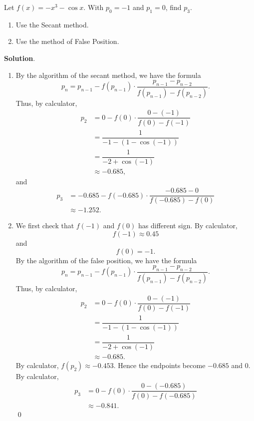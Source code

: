 \documentclass[11pt]{article}
\theoremstyle{break}
\numberwithin{equation}{theorem}
\begin{document}
\newpage
\begin{problem}\label{problem 7}
    Let $f(x)=-x^3-\cos x$. With $p_0=-1$ and $p_1=0$, find $p_3$.
    \begin{enumerate}
        \item Use the Secant method.
        \item Use the method of False Position.
    \end{enumerate}
\end{problem}
\textbf{Solution}.
\begin{enumerate}
    \item By the algorithm of the secant method, we have the formula
    \begin{equation*}
        p_n=p_{n-1}-f(p_{n-1})\cdot\dfrac{p_{n-1}-p_{n-2}}{f(p_{n-1})-f(p_{n-2})}.
    \end{equation*}
    Thus, by calculator,
    \begin{align*}
        p_2&=0-f(0)\cdot\dfrac{0-(-1)}{f(0)-f(-1)}\\
        &=\dfrac{1}{-1-(1-\cos(-1))}\\
        &=\dfrac{1}{-2+\cos(-1)}\\
        &\approx-0.685,
    \end{align*}
    and
    \begin{align*}
        p_3&=-0.685-f(-0.685)\cdot\dfrac{-0.685-0}{f(-0.685)-f(0)}\\
        &\approx-1.252.
    \end{align*}
    \item We first check that $f(-1)$ and $f(0)$ has different sign. By calculator,
    \begin{equation*}
        f(-1)\approx0.45
    \end{equation*}
    and
    \begin{equation*}
        f(0)=-1.
    \end{equation*}
    By the algorithm of the false position, we have the formula
    \begin{equation*}
        p_n=p_{n-1}-f(p_{n-1})\cdot\dfrac{p_{n-1}-p_{n-2}}{f(p_{n-1})-f(p_{n-2})}.
    \end{equation*}
    Thus, by calculator,
    \begin{align*}
        p_2&=0-f(0)\cdot\dfrac{0-(-1)}{f(0)-f(-1)}\\
        &=\dfrac{1}{-1-(1-\cos(-1))}\\
        &=\dfrac{1}{-2+\cos(-1)}\\
        &\approx-0.685.
    \end{align*}
    By calculator, $f(p_2)\approx-0.453$. Hence the endpoints become $-0.685$ and $0$. By calculator,
    \begin{align*}
        p_3&=0-f(0)\cdot\dfrac{0-(-0.685)}{f(0)-f(-0.685)}\\
        &\approx-0.841.
    \end{align*}
    \qed
\end{enumerate}
\end{document}

